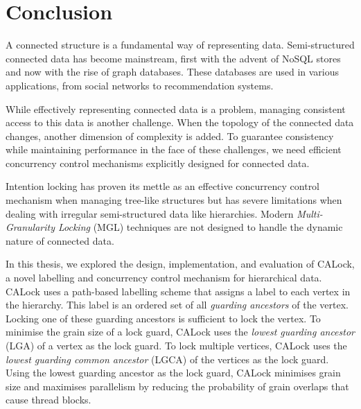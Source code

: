 %

\chapter{Conclusion} \label{chap:conclusion}
\minitoc

A connected structure is a fundamental way of representing data. Semi-structured connected data has become mainstream, first with the advent of NoSQL stores and now with the rise of graph databases. These databases are used in various applications, from social networks to recommendation systems. 

While effectively representing connected data is a problem, managing consistent access to this data is another challenge. When the topology of the connected data changes, another dimension of complexity is added. To guarantee consistency while maintaining performance in the face of these challenges, we need efficient concurrency control mechanisms explicitly designed for connected data.

Intention locking has proven its mettle as an effective concurrency control mechanism when managing tree-like structures but has severe limitations when dealing with irregular semi-structured data like hierarchies. Modern \emph{Multi-Granularity Locking} (MGL) techniques are not designed to handle the dynamic nature of connected data.

In this thesis, we explored the design, implementation, and evaluation of CALock, a novel labelling and concurrency control mechanism for hierarchical data. CALock uses a path-based labelling scheme that assigns a label to each vertex in the hierarchy. This label is an ordered set of all \emph{guarding ancestors} of the vertex. Locking one of these guarding ancestors is sufficient to lock the vertex. To minimise the grain size of a lock guard, CALock uses the \emph{lowest guarding ancestor} (LGA) of a vertex as the lock guard. To lock multiple vertices, CALock uses the \emph{lowest guarding common ancestor} (LGCA) of the vertices as the lock guard. Using the lowest guarding ancestor as the lock guard, CALock minimises grain size and maximises parallelism by reducing the probability of grain overlaps that cause thread blocks.




